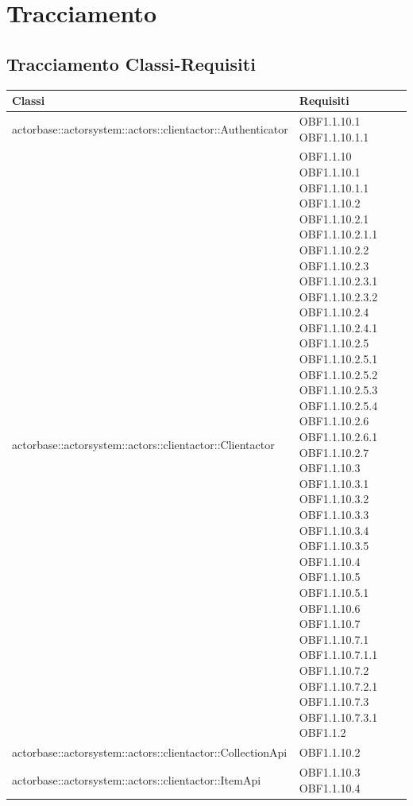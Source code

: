 \documentclass{scalatekids-article}
\begin{document}
\section{Tracciamento}

\subsection{Tracciamento Classi-Requisiti}
\begin{longtable}[H]{|p{12cm}|p{5.5cm}|}
  \hline
  \textbf{Classi} & \textbf{Requisiti}\\
  \hline
  actorbase::actorsystem::actors::clientactor::Authenticator & \multiLineCell[t]{OBF1.1.10.1\\OBF1.1.10.1.1\\}\\
  \hline
  actorbase::actorsystem::actors::clientactor::Clientactor & \multiLineCell[t]{OBF1.1.10 OBF1.1.10.1\\OBF1.1.10.1.1 OBF1.1.10.2\\OBF1.1.10.2.1 OBF1.1.10.2.1.1\\OBF1.1.10.2.2 OBF1.1.10.2.3\\OBF1.1.10.2.3.1 OBF1.1.10.2.3.2\\OBF1.1.10.2.4 OBF1.1.10.2.4.1\\OBF1.1.10.2.5 OBF1.1.10.2.5.1\\OBF1.1.10.2.5.2 OBF1.1.10.2.5.3\\OBF1.1.10.2.5.4 OBF1.1.10.2.6\\OBF1.1.10.2.6.1 OBF1.1.10.2.7\\OBF1.1.10.3 OBF1.1.10.3.1\\OBF1.1.10.3.2 OBF1.1.10.3.3\\OBF1.1.10.3.4 OBF1.1.10.3.5\\OBF1.1.10.4 OBF1.1.10.5\\OBF1.1.10.5.1 OBF1.1.10.6\\OBF1.1.10.7 OBF1.1.10.7.1\\OBF1.1.10.7.1.1 OBF1.1.10.7.2\\OBF1.1.10.7.2.1 OBF1.1.10.7.3\\OBF1.1.10.7.3.1 OBF1.1.2\\}\\
  \hline
  actorbase::actorsystem::actors::clientactor::CollectionApi & \multiLineCell[t]{OBF1.1.10.2\\}\\
  \hline
  actorbase::actorsystem::actors::clientactor::ItemApi & \multiLineCell[t]{OBF1.1.10.3 OBF1.1.10.4\\}\\

\end{longtable}
\end{document}
